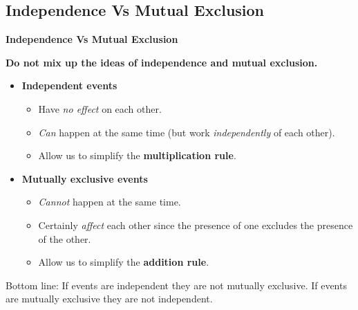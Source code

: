 \documentclass[compress]{beamer}        %
\makeatletter
\newcommand{\tcb}{\textcolor{beamer@blendedblue}}
\makeatother
\begin{document}
\subsection{Independence Vs Mutual Exclusion}
\begin{frame}{\bf \tcb{Independence Vs Mutual Exclusion}}

{\bf Do not mix up the ideas of independence and mutual exclusion.\\[0.3cm]}
\begin{itemize}\itemsep0.3cm
\item {\bf Independent events}
\begin{itemize}\itemsep0.2cm
\item Have \emph{no effect} on each other.
\item \emph{Can} happen at the same time (but work \emph{independently} of each other).
\item Allow us to simplify the {\bf multiplication rule}.
\end{itemize}
\item {\bf Mutually exclusive events}
\begin{itemize}\itemsep0.2cm
\item \emph{Cannot} happen at the same time.
\item Certainly \emph{affect} each other since the presence of one excludes the presence of the other.
\item Allow us to simplify the {\bf addition rule}.
\end{itemize}
\end{itemize}

Bottom line: If events are independent they are not mutually exclusive. If events are mutually exclusive they are not independent.

\end{frame}
\end{document}
